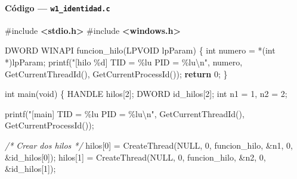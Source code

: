 \documentclass[
  spanish,
]{article}
\newenvironment{Shaded}{}{}
\newcommand{\CommentTok}[1]{\textcolor[rgb]{0.38,0.63,0.69}{\textit{#1}}}
\newcommand{\ControlFlowTok}[1]{\textcolor[rgb]{0.00,0.44,0.13}{\textbf{#1}}}
\newcommand{\DataTypeTok}[1]{\textcolor[rgb]{0.56,0.13,0.00}{#1}}
\newcommand{\DecValTok}[1]{\textcolor[rgb]{0.25,0.63,0.44}{#1}}
\newcommand{\ImportTok}[1]{\textcolor[rgb]{0.00,0.50,0.00}{\textbf{#1}}}
\newcommand{\NormalTok}[1]{#1}
\newcommand{\OperatorTok}[1]{\textcolor[rgb]{0.40,0.40,0.40}{#1}}
\newcommand{\PreprocessorTok}[1]{\textcolor[rgb]{0.74,0.48,0.00}{#1}}
\newcommand{\SpecialCharTok}[1]{\textcolor[rgb]{0.25,0.44,0.63}{#1}}
\newcommand{\StringTok}[1]{\textcolor[rgb]{0.25,0.44,0.63}{#1}}
\begin{document}
\paragraph{\texorpdfstring{Código ---
\texttt{w1\_identidad.c}}{Código --- w1\_identidad.c}}\label{cuxf3digo-w1_identidad.c}

\begin{Shaded}
\begin{Highlighting}[]
\PreprocessorTok{\#include }\ImportTok{\textless{}stdio.h\textgreater{}}
\PreprocessorTok{\#include }\ImportTok{\textless{}windows.h\textgreater{}}

\NormalTok{DWORD WINAPI funcion\_hilo}\OperatorTok{(}\NormalTok{LPVOID lpParam}\OperatorTok{)} \OperatorTok{\{}
    \DataTypeTok{int}\NormalTok{ numero }\OperatorTok{=} \OperatorTok{*(}\DataTypeTok{int} \OperatorTok{*)}\NormalTok{lpParam}\OperatorTok{;}
\NormalTok{    printf}\OperatorTok{(}\StringTok{"[hilo }\SpecialCharTok{\%d}\StringTok{] TID = }\SpecialCharTok{\%lu}\StringTok{  PID = }\SpecialCharTok{\%lu\textbackslash{}n}\StringTok{"}\OperatorTok{,}
\NormalTok{           numero}\OperatorTok{,}\NormalTok{ GetCurrentThreadId}\OperatorTok{(),}\NormalTok{ GetCurrentProcessId}\OperatorTok{());}
    \ControlFlowTok{return} \DecValTok{0}\OperatorTok{;}
\OperatorTok{\}}

\DataTypeTok{int}\NormalTok{ main}\OperatorTok{(}\DataTypeTok{void}\OperatorTok{)} \OperatorTok{\{}
\NormalTok{    HANDLE hilos}\OperatorTok{[}\DecValTok{2}\OperatorTok{];}
\NormalTok{    DWORD id\_hilos}\OperatorTok{[}\DecValTok{2}\OperatorTok{];}
    \DataTypeTok{int}\NormalTok{ n1 }\OperatorTok{=} \DecValTok{1}\OperatorTok{,}\NormalTok{ n2 }\OperatorTok{=} \DecValTok{2}\OperatorTok{;}

\NormalTok{    printf}\OperatorTok{(}\StringTok{"[main]   TID = }\SpecialCharTok{\%lu}\StringTok{  PID = }\SpecialCharTok{\%lu\textbackslash{}n}\StringTok{"}\OperatorTok{,}
\NormalTok{           GetCurrentThreadId}\OperatorTok{(),}\NormalTok{ GetCurrentProcessId}\OperatorTok{());}

    \CommentTok{/* Crear dos hilos */}
\NormalTok{    hilos}\OperatorTok{[}\DecValTok{0}\OperatorTok{]} \OperatorTok{=}\NormalTok{ CreateThread}\OperatorTok{(}\NormalTok{NULL}\OperatorTok{,} \DecValTok{0}\OperatorTok{,}\NormalTok{ funcion\_hilo}\OperatorTok{,} \OperatorTok{\&}\NormalTok{n1}\OperatorTok{,} \DecValTok{0}\OperatorTok{,} \OperatorTok{\&}\NormalTok{id\_hilos}\OperatorTok{[}\DecValTok{0}\OperatorTok{]);}
\NormalTok{    hilos}\OperatorTok{[}\DecValTok{1}\OperatorTok{]} \OperatorTok{=}\NormalTok{ CreateThread}\OperatorTok{(}\NormalTok{NULL}\OperatorTok{,} \DecValTok{0}\OperatorTok{,}\NormalTok{ funcion\_hilo}\OperatorTok{,} \OperatorTok{\&}\NormalTok{n2}\OperatorTok{,} \DecValTok{0}\OperatorTok{,} \OperatorTok{\&}\NormalTok{id\_hilos}\OperatorTok{[}\DecValTok{1}\OperatorTok{]);}


\end{Highlighting}
\end{Shaded}
\end{document}
